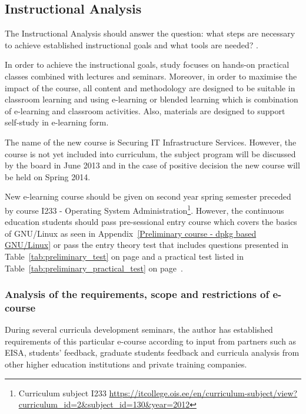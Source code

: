 \subsection{Instructional Analysis}
The Instructional Analysis should answer the question: what steps are necessary to achieve  established instructional goals and what tools are needed? \citep{website:addie}.

In order to achieve the instructional  goals, study focuses on hands-on practical classes combined with lectures and seminars. Moreover, in order to maximise the impact of the course, all content and methodology are designed to be suitable in classroom learning and using e-learning or blended learning which is combination of e-learning and classroom activities. Also, materials are designed to support self-study in e-learning form.

The name of the new course is Securing IT Infrastructure Services. However, the course is not yet included into curriculum, the subject program will be discussed by the board in June 2013 and in the case of positive decision the new course will be held on Spring 2014.

New e-learning course should be given on second year spring semester preceded by course I233 - Operating System Administration\footnote{Curriculum subject I233 \url{https://itcollege.ois.ee/en/curriculum-subject/view?curriculum_id=2&subject_id=130&year=2012}}. However, the continuous education students should pass pre-sessional entry course which covers the basics of GNU/Linux as seen in Appendix~\ref{Preliminary course - dpkg based GNU/Linux} or pass the entry theory test that includes questions presented in Table~\ref{tab:preliminary_test} on page \pageref{tab:preliminary_test} and a practical test listed in Table~\ref{tab:preliminary_practical_test} on page~\pageref{tab:preliminary_practical_test}.


\subsubsection{Analysis of the requirements, scope and restrictions of e-course}
During several curricula development seminars, the author has established  requirements of this particular e-course according to input from partners such as \gls{EISA}, students' feedback, graduate students feedback and curricula analysis from other higher education institutions and private training companies. 

